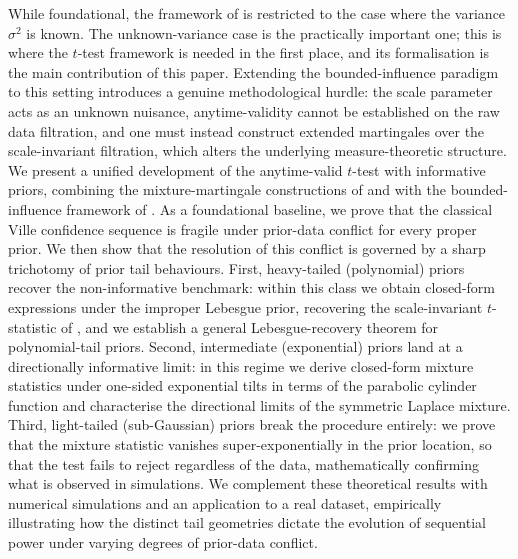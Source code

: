 \documentclass[numsec,webpdf,modern,medium,namedate]{oup-authoring-template}
\theoremstyle{thmstyleone}%
\theoremstyle{thmstyletwo}%
\theoremstyle{thmstylethree}%
\newcommand{\1}{\mathbf{1}}
\begin{document}
While foundational, the framework of \cite{Cortinovis2025} is restricted to the case where the variance $\sigma^2$ is known. The unknown-variance case is the practically important one; this is where the $t$-test framework is needed in the first place, and its formalisation is the main contribution of this paper. Extending the bounded-influence paradigm to this setting introduces a genuine methodological hurdle: the scale parameter acts as an unknown nuisance, anytime-validity cannot be established on the raw data filtration, and one must instead construct extended martingales over the scale-invariant filtration, which alters the underlying measure-theoretic structure. We present a unified development of the anytime-valid $t$-test with informative priors, combining the mixture-martingale constructions of \cite{Lai1976} and \cite{Wang2025} with the bounded-influence framework of \cite{Cortinovis2025}. As a foundational baseline, we prove that the classical Ville confidence sequence is fragile under prior-data conflict for every proper prior. We then show that the resolution of this conflict is governed by a sharp trichotomy of prior tail behaviours. First, heavy-tailed (polynomial) priors recover the non-informative benchmark: within this class we obtain closed-form expressions under the improper Lebesgue prior, recovering the scale-invariant $t$-statistic of \cite{Lai1976}, and we establish a general Lebesgue-recovery theorem for polynomial-tail priors. Second, intermediate (exponential) priors land at a directionally informative limit: in this regime we derive closed-form mixture statistics under one-sided exponential tilts in terms of the parabolic cylinder function and characterise the directional limits of the symmetric Laplace mixture. Third, light-tailed (sub-Gaussian) priors break the procedure entirely: we prove that the mixture statistic vanishes super-exponentially in the prior location, so that the test fails to reject regardless of the data, mathematically confirming what is observed in simulations. We complement these theoretical results with numerical simulations and an application to a real dataset, empirically illustrating how the distinct tail geometries dictate the evolution of sequential power under varying degrees of prior-data conflict.
\end{document}
